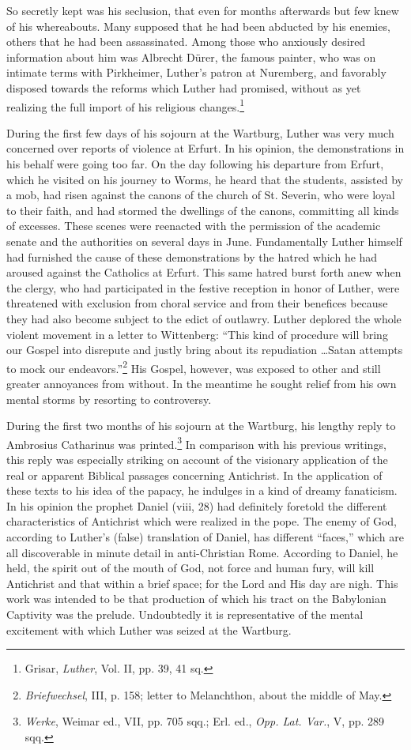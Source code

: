 So secretly kept was his seclusion, that even for months afterwards
but few knew of his whereabouts. Many supposed that he had been
abducted by his enemies, others that he had been assassinated. Among
those who anxiously desired information about him was Albrecht
Dürer, the famous painter, who was on intimate terms with Pirkheimer,
Luther’s patron at Nuremberg, and favorably disposed
towards the reforms which Luther had promised, without as yet
realizing the full import of his religious changes.\footnote{Grisar, \textit{Luther}, Vol. II, pp. 39, 41 sq.}

During the first few days of his sojourn at the Wartburg, Luther
was very much concerned over reports of violence at Erfurt. In
his opinion, the demonstrations in his behalf were going too far. On
the day following his departure from Erfurt, which he visited on
his journey to Worms, he heard that the students, assisted by a mob,
had risen against the canons of the church of St. Severin, who
were loyal to their faith, and had stormed the dwellings of the
canons, committing all kinds of excesses. These scenes were reenacted
with the permission of the academic senate and the authorities on
several days in June. Fundamentally Luther himself had furnished
the cause of these demonstrations by the hatred which he had
aroused against the Catholics at Erfurt. This same hatred burst
forth anew when the clergy, who had participated in the festive
reception in honor of Luther, were threatened with exclusion from
choral service and from their benefices because they had also become
subject to the edict of outlawry. Luther deplored the whole violent
movement in a letter to Wittenberg: “This kind of procedure will
bring our Gospel into disrepute and justly bring about its repudiation \dots Satan
attempts to mock our endeavors.”\footnote
{\textit{Briefwechsel}, III, p. 158; letter to Melanchthon, about the middle of May.}
His Gospel,
however, was exposed to other and still greater annoyances from
without. In the meantime he sought relief from his own mental
storms by resorting to controversy.

During the first two months of his sojourn at the Wartburg, his
lengthy reply to Ambrosius Catharinus was printed.\footnote{\textit{Werke}, Weimar ed., VII, pp. 705 sqq.; Erl. ed., \textit{Opp. Lat. Var.}, V, pp. 289 sqq.}
In comparison
with his previous writings, this reply was especially striking on account
of the visionary application of the real or apparent Biblical
passages concerning Antichrist. In the application of these texts
to his idea of the papacy, he indulges in a kind of dreamy fanaticism.
In his opinion the prophet Daniel (viii, 28) had definitely foretold
the different characteristics of Antichrist which were realized in
the pope. The enemy of God, according to Luther’s (false) translation of
Daniel, has different “faces,” which are all discoverable in
minute detail in anti-Christian Rome. According to Daniel, he held,
the spirit out of the mouth of God, not force and human fury, will
kill Antichrist and that within a brief space; for the Lord and
His day are nigh. This work was intended to be that production of
which his tract on the Babylonian Captivity was the prelude. Undoubtedly
it is representative of the mental excitement with which
Luther was seized at the Wartburg.

